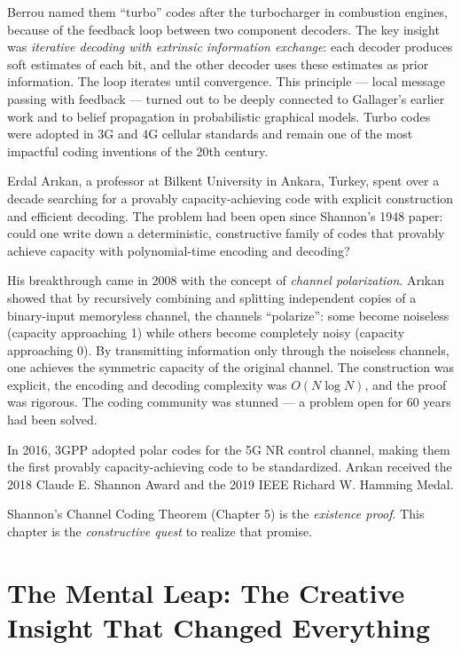 Berrou named them ``turbo'' codes after the turbocharger in combustion engines, because of the feedback loop between two component decoders. The key insight was \emph{iterative decoding with extrinsic information exchange}: each decoder produces soft estimates of each bit, and the other decoder uses these estimates as prior information. The loop iterates until convergence. This principle — local message passing with feedback — turned out to be deeply connected to Gallager's earlier work and to belief propagation in probabilistic graphical models. Turbo codes were adopted in 3G and 4G cellular standards and remain one of the most impactful coding inventions of the 20th century.

Erdal Arıkan, a professor at Bilkent University in Ankara, Turkey, spent over a decade searching for a provably capacity-achieving code with explicit construction and efficient decoding. The problem had been open since Shannon's 1948 paper: could one write down a deterministic, constructive family of codes that provably achieve capacity with polynomial-time encoding and decoding?

His breakthrough came in 2008 with the concept of \emph{channel polarization}. Arıkan showed that by recursively combining and splitting independent copies of a binary-input memoryless channel, the channels ``polarize'': some become noiseless (capacity approaching 1) while others become completely noisy (capacity approaching 0). By transmitting information only through the noiseless channels, one achieves the symmetric capacity of the original channel. The construction was explicit, the encoding and decoding complexity was $O(N \log N)$, and the proof was rigorous. The coding community was stunned — a problem open for 60 years had been solved.

In 2016, 3GPP adopted polar codes for the 5G NR control channel, making them the first provably capacity-achieving code to be standardized. Arıkan received the 2018 Claude E. Shannon Award and the 2019 IEEE Richard W. Hamming Medal.

Shannon's Channel Coding Theorem (Chapter 5) is the \emph{existence proof}. This chapter is the \emph{constructive quest} to realize that promise.

\section{The Mental Leap: The Creative Insight That Changed Everything}
\label{sec:ec:leap}

